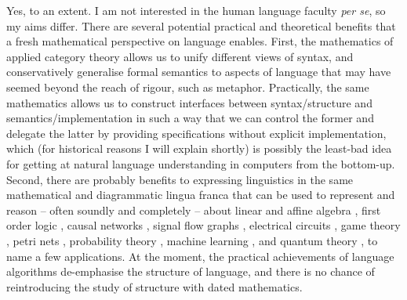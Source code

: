 
Yes, to an extent. I am not interested in the human language faculty \emph{per se}, so my aims differ. There are several potential practical and theoretical benefits that a fresh mathematical perspective on language enables. First, the mathematics of applied category theory allows us to unify different views of syntax, and conservatively generalise formal semantics to aspects of language that may have seemed beyond the reach of rigour, such as metaphor. Practically, the same mathematics allows us to construct interfaces between syntax/structure and semantics/implementation in such a way that we can control the former and delegate the latter by providing specifications without explicit implementation, which (for historical reasons I will explain shortly) is possibly the least-bad idea for getting at natural language understanding in computers from the bottom-up. Second, there are probably benefits to expressing linguistics in the same mathematical and diagrammatic lingua franca that can be used to represent and reason -- often soundly and completely -- about linear and affine algebra \citep{sobocinski_graphical_2015,bonchi_interacting_2017,bonchi_graphical_2019}, first order logic \citep{haydon_compositional_2020}, causal networks \citep{lorenz_causal_2023,jacobs_causal_2019}, signal flow graphs \citep{bonchi_categorical_2014}, electrical circuits \citep{boisseau_string_2022}, game theory \citep{hedges_string_2015}, petri nets \citep{baez_open_2020}, probability theory \citep{fritz_finettis_2021}, machine learning \citep{cruttwell_categorical_2022}, and quantum theory \citep{coecke_interacting_2011,coecke_picturing_2017,poor_completeness_2023}, to name a few applications. At the moment, the practical achievements of language algorithms de-emphasise the structure of language, and there is no chance of reintroducing the study of structure with dated mathematics.

\newpage


